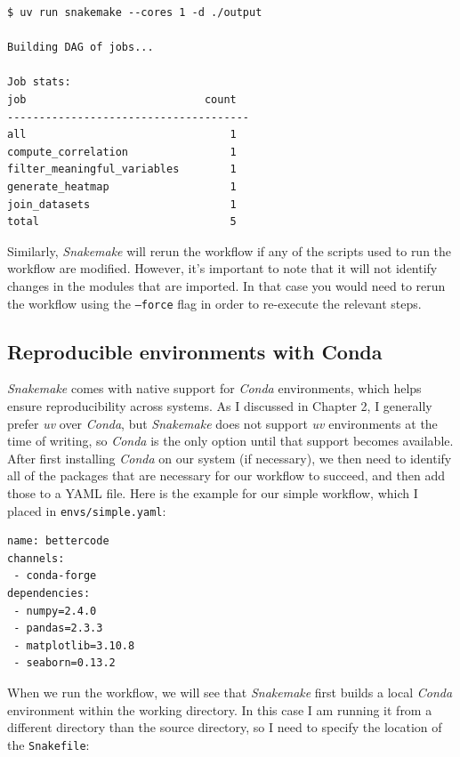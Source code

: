 \begin{lstlisting}[style=shell]
$ uv run snakemake --cores 1 -d ./output

Building DAG of jobs...

Job stats:
job                            count
--------------------------------------
all                                1
compute_correlation                1
filter_meaningful_variables        1
generate_heatmap                   1
join_datasets                      1
total                              5
\end{lstlisting}

Similarly, \textit{Snakemake} will rerun the workflow if any of the scripts used to run the workflow are modified.  However, it's important to note that it will not identify changes in the modules that are imported.  In that case you would need to rerun the workflow using the \texttt{--force} flag in order to re-execute the relevant steps.

\subsection{Reproducible environments with Conda}

\textit{Snakemake} comes with native support for \textit{Conda} environments, which helps ensure reproducibility across systems. As I discussed in Chapter 2, I generally prefer \textit{uv} over  \textit{Conda}, but \textit{Snakemake} does not support  \textit{uv} environments at the time of writing, so \textit{Conda} is the only option until that support becomes available.  After first installing \textit{Conda} on our system (if necessary), we then need to identify all of the packages that are necessary for our workflow to succeed, and then add those to a YAML file. Here is the example for our simple workflow, which I placed in \texttt{envs/simple.yaml}:

\begin{lstlisting}[style=yaml]
name: bettercode
channels:
 - conda-forge
dependencies:
 - numpy=2.4.0
 - pandas=2.3.3
 - matplotlib=3.10.8
 - seaborn=0.13.2
\end{lstlisting}

When we run the workflow, we will see that \textit{Snakemake} first builds a local \textit{Conda} environment within the working directory. In this case I am running it from a different directory than the source directory, so I need to specify the location of the \texttt{Snakefile}:

